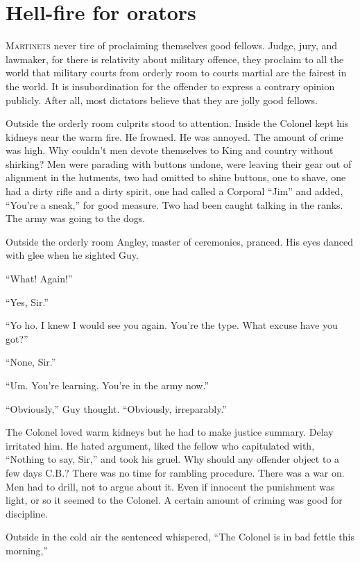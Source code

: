 \chapter*{\textsf{Hell-fire for orators}}

M\textsc{artinets} never tire of proclaiming themselves good fellows. 
Judge, jury, and lawmaker, for there is relativity about military 
offence, they proclaim to all the world that military courts from 
orderly room to courts martial are the fairest in the world. It is 
insubordination for the offender to express a contrary opinion 
publicly. After all, most dictators believe that they are jolly 
good fellows.

Outside the orderly room culprits stood to attention. Inside the 
Colonel kept his kidneys near the warm fire. He frowned. He was 
annoyed. The amount of crime was high. Why couldn't men devote 
themselves to King and country without shirking? Men were parading 
with buttons undone, were leaving their gear out of alignment in 
the hutments, two had omitted to shine buttons, one to shave, one 
had a dirty rifle and a dirty spirit, one had called a Corporal 
``Jim'' and added, ``You're a sneak,'' for good measure. Two had 
been caught talking in the ranks. The army was going to the dogs.

Outside the orderly room Angley, master of ceremonies, pranced. 
His eyes danced with glee when he sighted Guy.

``What! Again!''

``Yes, Sir.''

``Yo ho. I knew I would see you again. You're the type. What excuse 
have you got?''

``None, Sir.''

``Um. You're learning. You're in the army now.''

``Obviously,'' Guy thought. ``Obviously, irreparably.''

The Colonel loved warm kidneys but he had to make justice summary. 
Delay irritated him. He hated argument, liked the fellow who 
capitulated with, ``Nothing to say, Sir,''  and took his gruel. Why 
should any offender object to a few days C.B.? There was no time 
for rambling procedure. There was a war on. Men had to drill, not 
to argue about it. Even if innocent the punishment was light, or 
so it seemed to the Colonel. A certain amount of criming was good 
for discipline.

Outside in the cold air the sentenced whispered, ``The Colonel is 
in bad fettle this morning,''


